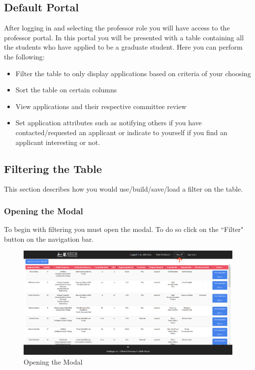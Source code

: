 \documentclass[fontsize=12pt,paper=letter,twoside]{scrartcl}
\begin{document}
\subsection{Default Portal}
After logging in and selecting the professor role you will have access to the professor portal. In this portal you will be presented with a table containing all the students who have applied to be a graduate student. Here you can perform the following:
\begin{itemize}
\item Filter the table to only display applications based on criteria of your choosing
\item Sort the table on certain columns
\item View applications and their respective committee review
\item Set application attributes such as notifying others if you have contacted/requested an applicant or indicate to yourself if you find an applicant interesting or not.
\end{itemize}

\subsection{Filtering the Table}
This section describes how you would use/build/save/load a filter on the table.

\newpage
\subsubsection{Opening the Modal}
To begin with filtering you must open the modal. To do so click on the ``Filter" button on the navigation bar.

\begin{figure}[!htb]
\begin{center}
\includegraphics[width=.99\textwidth]{images/prof/open_modal.png}
\end{center}
\caption{Opening the  Modal}
\label{fig:prof/open_modal}
\end{figure}
\end{document}
